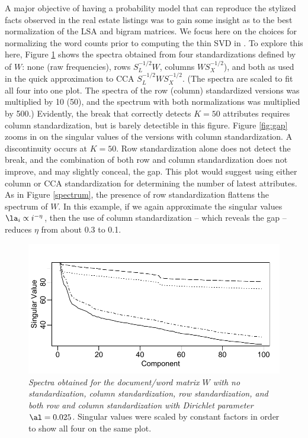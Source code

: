 \documentclass[12pt]{article}
\begin{document}
 A major objective of having a probability model that can reproduce the stylized facts observed in the real estate listings was to gain some insight as to the best normalization of the LSA and bigram matrices.  We focus here on the choices for normalizing the word counts prior to computing the thin SVD in .   To explore this here, Figure \ref{fig:spectra} shows the spectra obtained from four standardizations defined by   of $W$: none (raw frequencies), rows $S_L^{-1/2}W$, columns $WS_X^{-1/2}$), and both as used in the quick approximation to CCA  $S_L^{-1/2}WS_X^{-1/2}$.  (The spectra are scaled to fit all four into one plot. The spectra of the row (column) standardized versions was multiplied by 10 (50), and the spectrum with both normalizations was multiplied by 500.) Evidently, the break that correctly detects $K=50$ attributes requires column standardization, but is barely detectible in this figure.  Figure \ref{fig:gap} zooms in on the singular values of the versions with column standardization.  A discontinuity occurs at $K=50$.  Row standardization alone does not detect the break, and the combination of both row and column standardization does not improve, and may slightly conceal, the gap.  This plot would suggest using either column or CCA standardization for determining the number of latest attributes.  As in Figure \ref{spectrum}, the presence of row standardization flattens the spectrum of $W$.  In this example, if we again approximate the singular values $\la_i \propto i^{-\eta}$, then the use of column standardization -- which reveals the gap -- reduces $\eta$ from about 0.3 to 0.1.
 
 
\begin{figure}
\caption{ \label{fig:spectra} 
{ \sl Spectra obtained for the document/word matrix $W$ with no standardization, column standardization, row standardization, and both row and column standardization with Dirichlet parameter $\al = 0.025$.}  Singular values were scaled by constant factors in order to show all four on the same plot.}
 \centerline{
 \vspace{0.1in}
 \includegraphics[width=6.0in]{figures/spectra} }
 \end{figure}
\end{document}
